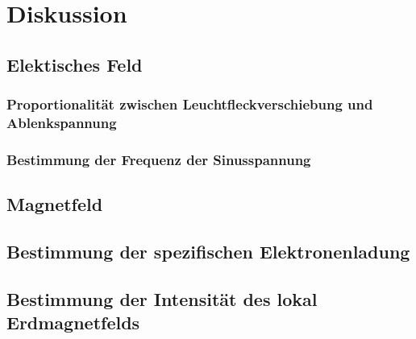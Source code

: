 \section{Diskussion}
\label{sec:Diskussion}

\subsection{Elektisches Feld}

\subsubsection{Proportionalität zwischen Leuchtfleckverschiebung und Ablenkspannung}
\subsubsection{Bestimmung der Frequenz der Sinusspannung}


\subsection{Magnetfeld}

\subsection{Bestimmung der spezifischen Elektronenladung}
\subsection{Bestimmung der Intensität des lokal Erdmagnetfelds}